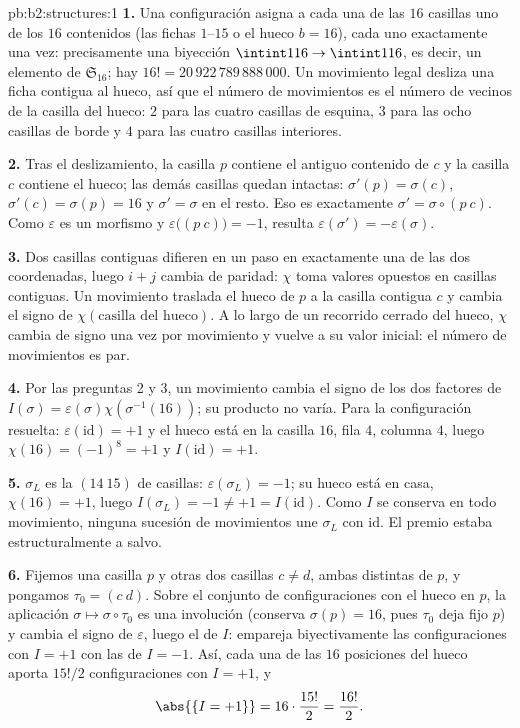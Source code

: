 \begin{solution}{pb:b2:structures:1}
\textbf{1.} Una configuración asigna a cada una de las $16$
casillas uno de los $16$ contenidos (las fichas $1$--$15$ o el
hueco $b = 16$), cada uno exactamente una vez: precisamente una
biyección $\intint1{16} \to \intint1{16}$, es decir, un elemento
de $\mathfrak{S}_{16}$; hay $16! = 20\,922\,789\,888\,000$. Un
movimiento legal desliza una ficha contigua al hueco, así que el
número de movimientos es el número de vecinos de la casilla del
hueco: $2$ para las cuatro casillas de esquina, $3$ para las ocho
casillas de borde y $4$ para las cuatro casillas interiores.

\textbf{2.} Tras el deslizamiento, la casilla $p$ contiene el
antiguo contenido de $c$ y la casilla $c$ contiene el hueco; las
demás casillas quedan intactas: $\sigma'(p) = \sigma(c)$,
$\sigma'(c) = \sigma(p) = 16$ y $\sigma' = \sigma$ en el resto.
Eso es exactamente $\sigma' = \sigma \circ (p\ c)$. Como
$\varepsilon$ es un morfismo y $\varepsilon\bigl((p\ c)\bigr) =
-1$, resulta $\varepsilon(\sigma') = -\varepsilon(\sigma)$.

\textbf{3.} Dos casillas contiguas difieren en un paso en
exactamente una de las dos coordenadas, luego $i + j$ cambia de
paridad: $\chi$ toma valores opuestos en casillas contiguas. Un
movimiento traslada el hueco de $p$ a la casilla contigua $c$ y
cambia el signo de $\chi(\text{casilla del hueco})$. A lo largo de
un recorrido cerrado del hueco, $\chi$ cambia de signo una vez por
movimiento y vuelve a su valor inicial: el número de movimientos
es par.

\textbf{4.} Por las preguntas 2 y 3, un movimiento cambia el signo
de los dos factores de $I(\sigma) =
\varepsilon(\sigma)\chi(\sigma^{-1}(16))$; su producto no varía.
Para la configuración resuelta: $\varepsilon(\mathrm{id}) = +1$ y
el hueco está en la casilla $16$, fila $4$, columna $4$, luego
$\chi(16) = (-1)^{8} = +1$ y $I(\mathrm{id}) = +1$.

\textbf{5.} $\sigma_L$ es la  $(14\ 15)$ de casillas:
$\varepsilon(\sigma_L) = -1$; su hueco está en casa, $\chi(16) =
+1$, luego $I(\sigma_L) = -1 \neq +1 = I(\mathrm{id})$. Como $I$
se conserva en todo movimiento, ninguna sucesión de movimientos
une $\sigma_L$ con $\mathrm{id}$. El premio estaba estructuralmente
a salvo.

\textbf{6.} Fijemos una casilla $p$ y otras dos casillas $c \neq
d$, ambas distintas de $p$, y pongamos $\tau_0 = (c\ d)$. Sobre el
conjunto de configuraciones con el hueco en $p$, la aplicación
$\sigma \mapsto \sigma \circ \tau_0$ es una involución (conserva
$\sigma(p) = 16$, pues $\tau_0$ deja fijo $p$) y cambia el signo de
$\varepsilon$, luego el de $I$: empareja biyectivamente las
configuraciones con $I = +1$ con las de $I = -1$. Así, cada una de
las $16$ posiciones del hueco aporta $15!/2$ configuraciones con $I
= +1$, y
\[
\abs{\{I = +1\}} = 16 \cdot \frac{15!}{2} = \frac{16!}{2}.
\]


\end{solution}

